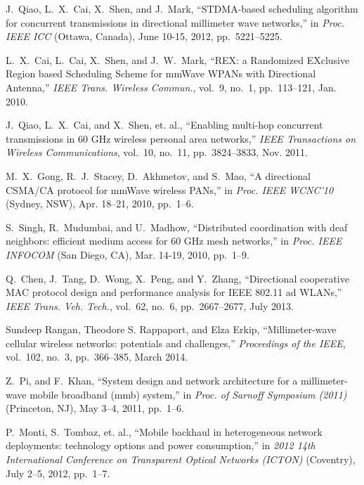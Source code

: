 \documentclass[journal]{IEEEtran}
\begin{document}
\begin{thebibliography}{10}
 J.~Qiao, L.~X.~Cai, X.~Shen, and J.~Mark, ``STDMA-based scheduling algorithm for concurrent
transmissions in directional millimeter wave networks,'' in \emph{Proc. IEEE ICC} (Ottawa, Canada),
June 10-15, 2012, pp.~5221--5225.


 L.~X.~Cai, L.~Cai, X.~Shen, and J.~W.~Mark, ``REX: a Randomized EXclusive Region based Scheduling
Scheme for mmWave WPANs with Directional Antenna,'' \emph{IEEE Trans. Wireless Commun.}, vol.~9,
no.~1, pp.~113--121, Jan. 2010.

 J.~Qiao, L.~X.~Cai, and X.~Shen, et. al., ``Enabling multi-hop concurrent transmissions in 60 GHz
wireless personal area networks,'' \emph{IEEE Transactions on Wireless Communications}, vol.~10,
no.~11, pp.~3824--3833, Nov. 2011.

 M.~X.~Gong, R.~J.~Stacey, D.~Akhmetov, and S.~Mao, ``A directional CSMA/CA protocol for mmWave
wireless PANs,'' in \emph{Proc. IEEE WCNC'10} (Sydney, NSW), Apr. 18--21, 2010, pp.~1--6.








 S.~Singh, R.~Mudumbai, and U.~Madhow, ``Distributed coordination
with deaf neighbors: efficient medium access for 60 GHz mesh
networks,'' in \emph{Proc. IEEE INFOCOM} (San Diego, CA), Mar.
14-19, 2010, pp.~1--9.


 Q.~Chen, J.~Tang, D.~Wong, X.~Peng, and Y.~Zhang, ``Directional cooperative MAC protocol design and
performance analysis for IEEE 802.11 ad WLANs,'' \emph{IEEE Trans. Veh. Tech.}, vol.~62, no.~6,
pp.~2667--2677, July 2013.

Sundeep Rangan, Theodore S. Rappaport, and Elza Erkip, ``Millimeter-wave cellular wireless
networks: potentials and challenges,'' \emph{Proceedings of the IEEE}, vol.~102, no.~3,
pp.~366--385, March 2014.


Z.~Pi, and F.~Khan, ``System design and network architecture for a millimeter-wave mobile broadband
(mmb) system,'' in \emph{Proc. of Sarnoff Symposium (2011)} (Princeton, NJ), May 3--4, 2011,
pp.~1--6.



P.~Monti, S.~Tombaz, et. al., ``Mobile backhaul in heterogeneous network deployments: technology
options and power consumption,'' in \emph{2012 14th International Conference on Transparent Optical
Networks (ICTON)} (Coventry), July 2--5, 2012, pp.~1--7.


\end{thebibliography}
\end{document}
